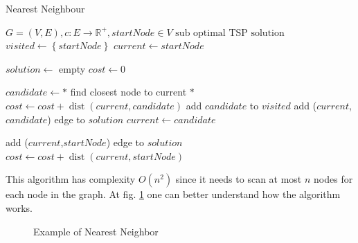 \begin{algorithm}
    \caption{Nearest Neighbour}\label{algo:greedy}
    \begin{algorithmic}[1]
    \Require $G = (V,E), c:E \to \mathbb{R}^+, startNode \in V$
    \Ensure $\text{sub optimal TSP solution}$
    \State $visited \gets \left \{ startNode \right \}$
    \State $current \gets startNode$




    \State $solution \gets$ empty
    \State $cost \gets 0$




    \State $candidate \gets *$ find closest node to current $*$
    \State $cost \gets cost + \operatorname{dist}(current, candidate)$
    \State add $candidate$ to $visited$
    \State add ($current$,$candidate$) edge to $solution$
    \State $current \gets candidate$
    \EndWhile




    \State add ($current$,$startNode$) edge to $solution$
    \State $cost \gets cost + \operatorname{dist}(current, startNode)$


    \end{algorithmic}
\end{algorithm}

This algorithm has complexity $O(n^2)$ since it needs to scan at most $n$ nodes for each node in the graph. At fig. \ref{fig:greedy} one can better understand how the algorithm works.

\begin{figure}[!h]
    \centering
    \caption{Example of Nearest Neighbor} \label{fig:greedy}
\end{figure}

